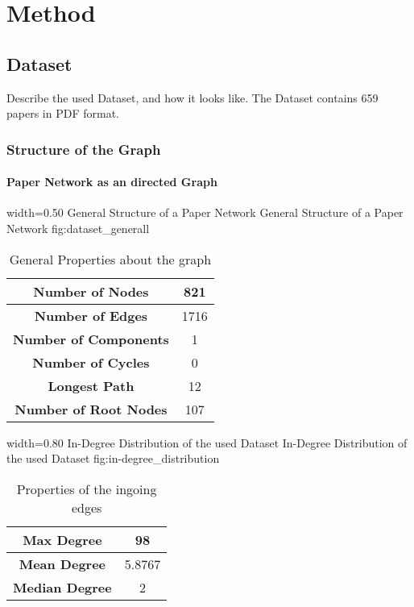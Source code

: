 \chapter{Method}
\label{cha:method}

\section{Dataset}
\label{sec:dataset}

Describe the used Dataset, and how it looks like.
The Dataset contains 659 papers in PDF format.

\subsection{Structure of the Graph}
\label{sec:structure_of_the_graph}

\subsubsection{Paper Network as an directed Graph}
\label{sec:undirected_graph}

      {width=0.50\textwidth}
      {General Structure of a Paper Network}
      {General Structure of a Paper Network}
      {fig:dataset_generall}

\begin{table}
  \centering
  \begin{tabular}{ | c | c | }
    \hline
    \textbf{Number of Nodes} & 821 \\ \hline
    \textbf{Number of Edges} & 1716 \\ \hline
    \textbf{Number of Components} & 1 \\ \hline
    \textbf{Number of Cycles} & 0 \\ \hline
    \textbf{Longest Path} & 12 \\ \hline
    \textbf{Number of Root Nodes} & 107 \\ \hline
  \end{tabular}
  \caption[General Properties about the graph in the used dataset]{General Properties about the graph}
  \label{tbl:general_properties_about_the_graph}
\end{table}


      {width=0.80\textwidth}
      {In-Degree Distribution of the used Dataset}
      {In-Degree Distribution of the used Dataset}
      {fig:in-degree_distribution}

\begin{table}
  \centering
  \begin{tabular}{ | c | c | }
    \hline
    \textbf{Max Degree} & 98 \\ \hline
    \textbf{Mean Degree} & 5.8767 \\ \hline
    \textbf{Median Degree} & 2 \\ \hline
  \end{tabular}
  \caption[Properties of the ingoing edges in the used dataset]{Properties of the ingoing edges}
  \label{tbl:properties_ingoing_edges}
\end{table}

